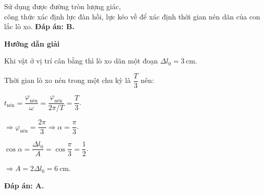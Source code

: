 \begin{dang}{Sử dụng được đường tròn lượng giác,\\ công thức xác định lực đàn hồi, lực kéo về để xác định thời gian nén dãn của con lắc lò xo.
	}
{		\textbf{Đáp án: B.}
	}
	{\begin{center}
			\textbf{Hướng dẫn giải}
		\end{center}
		
		Khi vật ở vị trí cân bằng thì lò xo dãn một đoạn $\Delta l_0=3\ \text{cm}$.
		
		
		Thời gian lò xo nén trong một chu kỳ là $\dfrac{T}{3}$ nên:
		
		$t_\text{nén}=\dfrac{\varphi_\text{nén}}{\omega}=\dfrac{\varphi_\text{nén}}{2\pi/T}=\dfrac{T}{3}$.
		
		$\Rightarrow \varphi_\text{nén}=\dfrac{2\pi}{3}\Rightarrow \alpha=\dfrac{\pi}{3}$.
		
		$\cos \alpha=\dfrac{\Delta l_0}{A}=\cos \dfrac{\pi}{3}=\dfrac{1}{2}$.
		
		$\Rightarrow A= 2\Delta l_0=\text{6}\ \text{cm}$.
		
		\textbf{Đáp án: A.}
	}
	
	
\end{dang}
